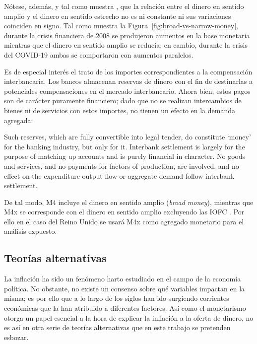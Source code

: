 \documentclass[titlepage, 12pt]{article}
\begin{document}
Nótese, además, y tal como muestra \cite[76]{bordo2021}, que la relación entre el dinero en sentido amplio y el dinero en sentido estrecho no es ni constante ni sus variaciones coinciden en signo. Tal como muestra la Figura~\ref{fig:broad-vs-narrow-money}, durante la crisis financiera de 2008 se produjeron aumentos en la base monetaria mientras que el dinero en sentido amplio se reducía; en cambio, durante la crisis del COVID-19 ambas se comportaron con aumentos paralelos.

Es de especial interés el trato de los importes correspondientes a la compensación interbancaria. Los bancos almacenan reservas de dinero con el fin de destinarlas a potenciales compensaciones en el mercado interbancario. Ahora bien, estos pagos son de carácter puramente financiero; dado que no se realizan intercambios de bienes ni de servicios con estos importes, no tienen un efecto en la demanda agregada:

\begin{displayquote}
    Such reserves, which are fully convertible into legal tender, do constitute ‘money’ for the banking industry, but only for it. Interbank settlement is largely for the purpose of matching up accounts and is purely financial in character. No goods and services, and no payments for factors of production, are involved, and no effect on the expenditure-output flow or aggregate demand follow interbank settlement. \autocite[41]{congdon2024}
\end{displayquote}

De tal modo, M4 incluye el dinero en sentido amplio (\textit{broad money}), mientras que M4x se corresponde con el dinero en sentido amplio excluyendo las IOFC \autocite[41]{congdon2024}. Por ello en el caso del Reino Unido se usará M4x como agregado monetario para el análisis expuesto.

\subsection{Teorías alternativas}

La inflación ha sido un fenómeno harto estudiado en el campo de la economía política. No obstante, no existe un consenso sobre qué variables impactan en la misma; es por ello que a lo largo de los siglos han ido surgiendo corrientes económicas que la han atribuido a diferentes factores. Así como el monetarismo otorga un papel esencial a la hora de explicar la inflación a la oferta de dinero, no es así en otra serie de teorías alternativas que en este trabajo se pretenden esbozar.
\end{document}
